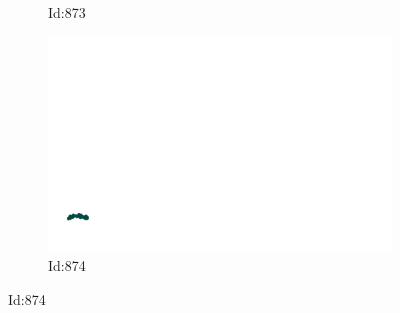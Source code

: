 \documentclass[12pt,twoside]{report}
\begin{document}
\begin{figure}
\begin{subfigure}[b]{0.20\textwidth}
\caption{Id:873}
\end{subfigure}
\begin{subfigure}[b]{0.20\textwidth}
\centering
\includegraphics[width=\textwidth]{../../trajectories/874.png}
\caption{Id:874}
\end{subfigure}
\end{figure}
\end{document}
